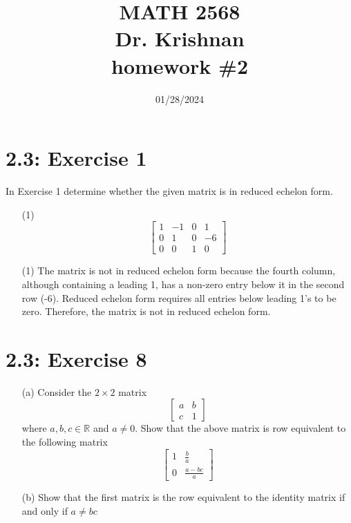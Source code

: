 \documentclass{report}
\title{\Huge{MATH 2568}\\\huge{Dr. Krishnan}\\homework \#2}
\author{\Huge{\mylink{https://www.sohumsuthar.com}{Sohum Suthar}}}
\date{\huge {01/28/2024}}
\begin{document}
\maketitle
\newpage
{}	
\tableofcontents
\pagebreak





\section*{2.3: Exercise 1} 

In Exercise 1 determine
whether the given matrix is in reduced echelon form.

\begin{enumerate}
    \item[(1)] 
    \[
\begin{bmatrix} 1 & -1 & 0 & 1 \\0 &  1 &  0 &  -6\\ 0 & 0 & 1 & 0 \end{bmatrix}
\]
    
\end{enumerate}

\sol

\begin{enumerate}
\item[(1)] The matrix is not in reduced echelon form because the fourth column, although containing a leading 1, has a non-zero entry below it in the second row (-6). Reduced echelon form requires all entries below leading 1's to be zero. Therefore, the matrix is $\boxed{\text{not}}$ in reduced echelon form.
\end{enumerate}










\section*{2.3: Exercise 8} 

\begin{enumerate}
    \item[(a)] Consider the $2\times 2$ matrix
    \[ 
   \begin{bmatrix} a & b \\ c & 1 \end{bmatrix}
    \]
    where $a,b,c\in\mathbb{R}$ and $a\neq 0$.  Show that the above matrix is row equivalent to the following matrix
\[
\begin{bmatrix} 1 & \frac{b}{a} \\ 0 & \frac{a-bc}{a}
\end{bmatrix} 
\]

    
    \item[(b)] Show that the first matrix is the row equivalent to the
identity matrix if and only if $a\neq bc$

\end{enumerate}
\end{document}
